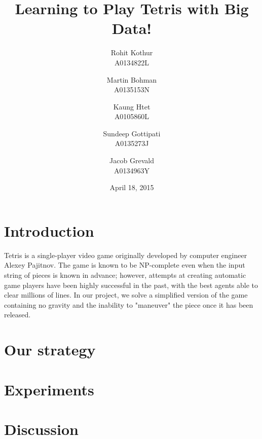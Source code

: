 \documentclass[12pt,twocolumn]{article}
\title{Learning to Play Tetris with Big Data!}
\author{
	Rohit Kothur \\ A0134822L \and
	Martin Bohman \\ A0135153N \and
	Kaung Htet \\ A0105860L \and \quad
	Sundeep Gottipati \\ A0135273J \and
	Jacob Grevald \\ A0134963Y}
\date{April 18, 2015}
\begin{document}
\maketitle

\section*{Introduction}

Tetris is a single-player video game originally developed by computer engineer Alexey Pajitnov. The game is known to be NP-complete even when the input string of pieces is known in advance; however, attempts at creating automatic game players have been highly successful in the past, with the best agents able to clear millions of lines. In our project, we solve a simplified version of the game containing no gravity and the inability to "maneuver" the piece once it has been released.

\section*{Our strategy}

\section*{Experiments}

\section*{Discussion}
\end{document}
